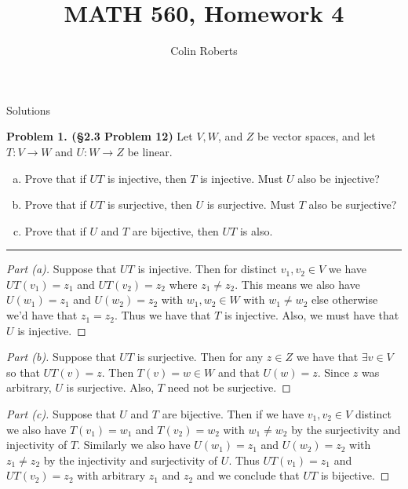 \documentclass[leqno]{article}
\author{Colin Roberts}
\title{MATH 560, Homework 4}
\theoremstyle{nonumberplain}
\newtheorem{proof}{Proof}
\begin{document}
\maketitle
\begin{large}
\begin{center}
Solutions
\end{center}
\end{large}
\pagebreak

\noindent\textbf{Problem 1. (\S 2.3 Problem 12)} Let $V,W$, and $Z$ be vector spaces, and let $T\colon V\to W$ and $U\colon W \to Z$ be linear.
\begin{enumerate}[(a)]
\item Prove that if $UT$ is injective, then $T$ is injective. Must $U$ also be injective?
\item Prove that if $UT$ is surjective, then $U$ is surjective. Must $T$ also be surjective?
\item Prove that if $U$ and $T$ are bijective, then $UT$ is also.
\end{enumerate}

\noindent\rule[0.5ex]{\linewidth}{1pt}

\begin{proof}[Part (a)]
Suppose that $UT$ is injective. Then for distinct $v_1,v_2\in V$ we have $UT(v_1)=z_1$ and $UT(v_2)=z_2$ where $z_1\neq z_2$.  This means we also have $U(w_1)=z_1$ and $U(w_2)=z_2$ with $w_1,w_2\in W$ with $w_1\neq w_2$ else otherwise we'd have that $z_1=z_2$.  Thus we have that $T$ is injective.  Also, we must have that $U$ is injective.
\end{proof}

\begin{proof}[Part (b)]
Suppose that $UT$ is surjective.  Then for any $z\in Z$ we have that $\exists v\in V$ so that $UT(v)=z$. Then $T(v)=w\in W$ and that $U(w)=z$. Since $z$ was arbitrary, $U$ is surjective.  Also, $T$ need not be surjective.  
\end{proof}

\begin{proof}[Part (c)]
Suppose that $U$ and $T$ are bijective.  Then if we have $v_1,v_2\in V$ distinct we also have $T(v_1)=w_1$ and $T(v_2)=w_2$ with $w_1\neq w_2$ by the surjectivity and injectivity of $T$.  Similarly we also have $U(w_1)=z_1$ and $U(w_2)=z_2$ with $z_1\neq z_2$ by the injectivity and surjectivity of $U$. Thus $UT(v_1)=z_1$ and $UT(v_2)=z_2$ with arbitrary $z_1$ and $z_2$ and we conclude that $UT$ is bijective.
\end{proof}
\end{document}
